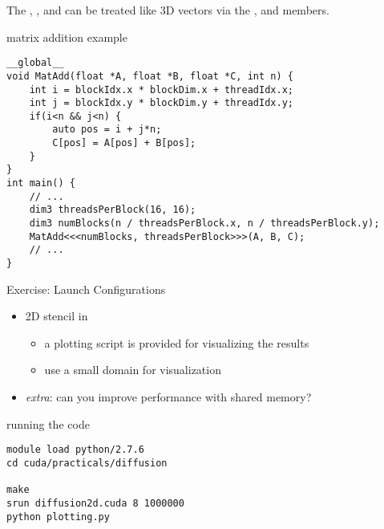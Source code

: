 \begin{frame}[fragile]{}

    The , ,  and  can be treated like 3D vectors via the ,  and  members.
    \begin{code}{matrix addition example}
        \begin{lstlisting}[style=boxcudatiny]
__global__
void MatAdd(float *A, float *B, float *C, int n) {
    int i = blockIdx.x * blockDim.x + threadIdx.x;
    int j = blockIdx.y * blockDim.y + threadIdx.y;
    if(i<n && j<n) {
        auto pos = i + j*n;
        C[pos] = A[pos] + B[pos];
    }
}
int main() {
    // ...
    dim3 threadsPerBlock(16, 16);
    dim3 numBlocks(n / threadsPerBlock.x, n / threadsPerBlock.y);
    MatAdd<<<numBlocks, threadsPerBlock>>>(A, B, C);
    // ...
}
        \end{lstlisting}
   \end{code}

\end{frame}

\begin{frame}[fragile]{Exercise: Launch Configurations}
    \begin{itemize}
        \item 2D stencil in 
        \begin{itemize}
            \item a plotting script is provided for visualizing the results
            \item use a small domain for visualization
        \end{itemize}
        \item \emph{extra}: can you improve performance with shared memory?
    \end{itemize}

    \begin{code}{running the code}
        \begin{lstlisting}[style=boxcudatiny]
module load python/2.7.6
cd cuda/practicals/diffusion

make
srun diffusion2d.cuda 8 1000000
python plotting.py
        \end{lstlisting}
   \end{code}

\end{frame}

